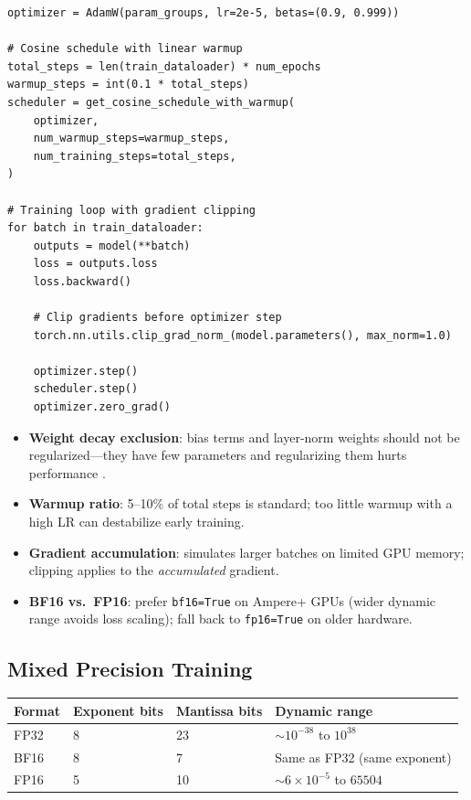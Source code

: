\begin{lstlisting}[style=pythonstyle, caption={Complete optimizer configuration combining AdamW -- cosine schedule -- and gradient clipping.}]
optimizer = AdamW(param_groups, lr=2e-5, betas=(0.9, 0.999))

# Cosine schedule with linear warmup
total_steps = len(train_dataloader) * num_epochs
warmup_steps = int(0.1 * total_steps)
scheduler = get_cosine_schedule_with_warmup(
    optimizer,
    num_warmup_steps=warmup_steps,
    num_training_steps=total_steps,
)

# Training loop with gradient clipping
for batch in train_dataloader:
    outputs = model(**batch)
    loss = outputs.loss
    loss.backward()

    # Clip gradients before optimizer step
    torch.nn.utils.clip_grad_norm_(model.parameters(), max_norm=1.0)

    optimizer.step()
    scheduler.step()
    optimizer.zero_grad()
\end{lstlisting}

\begin{keybox}
\begin{itemize}
  \item \textbf{Weight decay exclusion}: bias terms and layer-norm weights should not be regularized---they have few parameters and regularizing them hurts performance \cite{loshchilov2019adamw}.
  \item \textbf{Warmup ratio}: 5--10\% of total steps is standard; too little warmup with a high LR can destabilize early training.
  \item \textbf{Gradient accumulation}: simulates larger batches on limited GPU memory; clipping applies to the \emph{accumulated} gradient.
  \item \textbf{BF16 vs.~FP16}: prefer \texttt{bf16=True} on Ampere+ GPUs (wider dynamic range avoids loss scaling); fall back to \texttt{fp16=True} on older hardware.
\end{itemize}
\end{keybox}

\subsection{Mixed Precision Training}
\label{mixed-precision-training}

\begin{keybox}[BF16 vs. FP16]
\begin{tabular}{@{}lp{3.5cm}p{3.5cm}p{4cm}@{}}
\toprule
\textbf{Format} & \textbf{Exponent bits} & \textbf{Mantissa bits} & \textbf{Dynamic range} \\
\midrule
FP32 & 8 & 23 & $\sim 10^{-38}$ to $10^{38}$ \\
BF16 & 8 & 7 & Same as FP32 (same exponent) \\
FP16 & 5 & 10 & $\sim 6 \times 10^{-5}$ to $65504$ \\
\bottomrule
\end{tabular}
\end{keybox}

